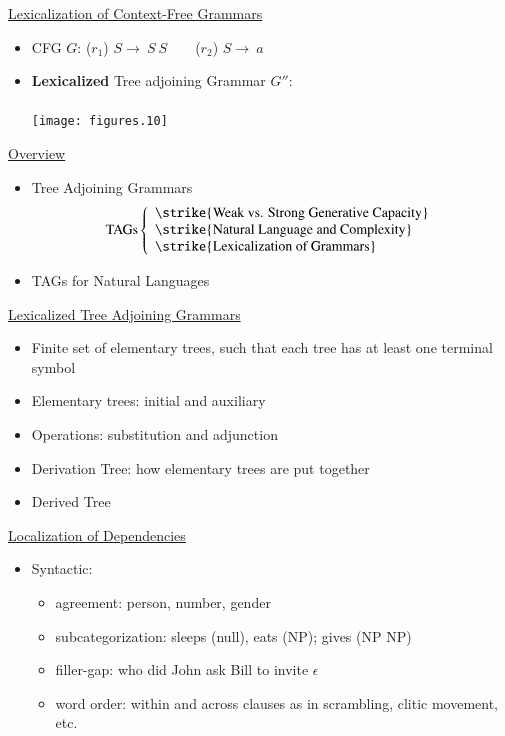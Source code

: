 \documentclass[landscape]{slides}
\begin{document}
\begin{slide}{\underline{Lexicalization of Context-Free Grammars}}
\begin{itemize}
\item CFG $G$: ($r_1$) $S \rightarrow\ S\ S$\ \ \ \ ($r_2$) $S \rightarrow\ a$
\item {\bf Lexicalized} Tree adjoining Grammar $G''$:\\\ 
\\
\texttt{[image: figures.10]}
\end{itemize}
\end{slide}

\begin{slide}{\underline{Overview}}
\begin{itemize}
\item Tree Adjoining Grammars \[ \textrm{TAGs} \left\{ 
\begin{array}{l}
\textrm{\strike{Weak vs. Strong Generative Capacity}}\\
\textrm{\strike{Natural Language and Complexity}}\\
\textrm{\strike{Lexicalization of Grammars}}
\end{array}
\right. \]
\item TAGs for Natural Languages
\end{itemize}
\end{slide}

\begin{slide}{\underline{Lexicalized Tree Adjoining Grammars}}
\begin{itemize}
\item Finite set of elementary trees, such that each tree has at least
  one terminal symbol
\item Elementary trees: initial and auxiliary
\item Operations: substitution and adjunction
\item Derivation Tree: how elementary trees are put together
\item Derived Tree
\end{itemize}
\end{slide}

\begin{slide}{\underline{Localization of Dependencies}}
\begin{itemize}
\item Syntactic: 
\begin{itemize}
\item agreement: person, number, gender
\item subcategorization: sleeps (null), eats (NP); gives (NP NP)
\item filler-gap: {\color{blue} who} did John ask Bill to invite
  {\color{blue} $\epsilon$}
\item word order: within and across clauses as in scrambling, clitic
  movement, etc. 
\end{itemize}
\end{itemize}
\end{slide}
\end{document}
